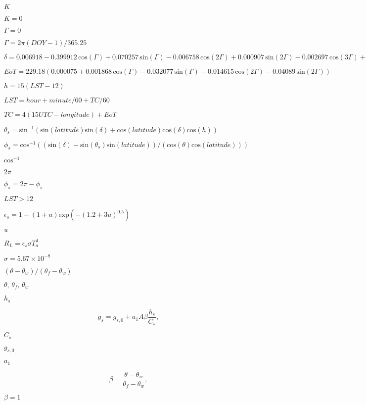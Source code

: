 \documentclass{article}
\begin{document}
$K$
\pagebreak

$K=0$
\pagebreak

$\Gamma=0$
\pagebreak

$\Gamma = 2\pi(DOY-1)/365.25$
\pagebreak

$\delta = 0.006918 - 0.399912\,\mathrm{cos}(\Gamma) + 0.070257\,\mathrm{sin}(\Gamma)- 0.006758\,\mathrm{cos}(2\Gamma) + 0.000907\,\mathrm{sin}(2\Gamma) - 0.002697\,\mathrm{cos}(3\Gamma) + 0.00148\,\mathrm{sin}(3\Gamma)$
\pagebreak

$EoT = 229.18(0.000075 + 0.001868\,\mathrm{cos}(\Gamma) - 0.032077\,\mathrm{sin}(\Gamma) - 0.014615\,\mathrm{cos}(2\Gamma) - 0.04089\,\mathrm{sin}(2\Gamma))$
\pagebreak

$h=15(LST-12)$
\pagebreak

$LST=hour+minute/60+TC/60$
\pagebreak

$TC=4(15UTC-longitude)+EoT$
\pagebreak

$\theta_s=\mathrm{sin}^{-1}( \mathrm{sin}(latitude)\mathrm{sin}(\delta) + \mathrm{cos}(latitude)\mathrm{cos}(\delta)\mathrm{cos}(h) )$
\pagebreak

$\phi_s=\mathrm{cos}^{-1}( (\mathrm{sin}(\delta) - \mathrm{sin}(\theta_s)\mathrm{sin}(latitude))/(\mathrm{cos}(\theta)\mathrm{cos}(latitude)))$
\pagebreak

$\mathrm{cos}^{-1}$
\pagebreak

$2\pi$
\pagebreak

$\phi_s=2\pi-\phi_s$
\pagebreak

$LST>12$
\pagebreak

$\epsilon_s = 1-(1+u)\mathrm{exp}\left(-\left(1.2+3u\right)^{0.5}\right)$
\pagebreak

$u$
\pagebreak

$R_L=\epsilon_s\sigma T_a^4$
\pagebreak

$\sigma=5.67\times10^{-8}$
\pagebreak

$(\theta-\theta_w)/(\theta_f-\theta_w)$
\pagebreak

$\theta,\,\theta_f,\,\theta_w$
\pagebreak

$h_s$
\pagebreak

\[g_s = g_{s,0}+a_1A\beta\frac{h_s}{C_s},\]
\pagebreak

$C_s$
\pagebreak

$g_{s,0}$
\pagebreak

$a_1$
\pagebreak

\[\beta = \frac{\theta-\theta_w}{\theta_f-\theta_w},\]
\pagebreak

$\beta=1$
\pagebreak
\end{document}
